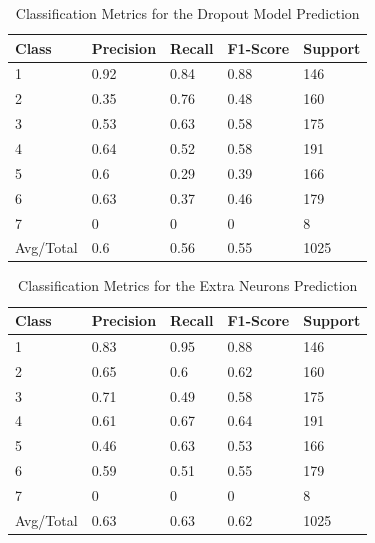 \documentclass[11pt]{article}
\begin{document}
	\begin{table}[H]
		\centering
		\caption{Classification Metrics for the Dropout Model Prediction}
		\begin{tabular}{l|llll}
			Class     & Precision & Recall & F1-Score & Support \\\hline
			1         & 0.92      & 0.84   & 0.88     & 146     \\
			2         & 0.35      & 0.76   & 0.48     & 160     \\
			3         & 0.53      & 0.63   & 0.58     & 175     \\
			4         & 0.64      & 0.52   & 0.58     & 191     \\
			5         & 0.6       & 0.29   & 0.39     & 166     \\
			6         & 0.63      & 0.37   & 0.46     & 179     \\
			7         & 0         & 0      & 0        & 8       \\
			Avg/Total & 0.6       & 0.56   & 0.55     & 1025   \\\hline\hline
		\end{tabular}
	\end{table}
	
	\begin{table}[H]
		\centering
		\caption{Classification Metrics for the Extra Neurons Prediction}
		\begin{tabular}{l|llll}
			Class     & Precision & Recall & F1-Score & Support \\\hline
			1         & 0.83      & 0.95   & 0.88     & 146     \\
			2         & 0.65      & 0.6    & 0.62     & 160     \\
			3         & 0.71      & 0.49   & 0.58     & 175     \\
			4         & 0.61      & 0.67   & 0.64     & 191     \\
			5         & 0.46      & 0.63   & 0.53     & 166     \\
			6         & 0.59      & 0.51   & 0.55     & 179     \\
			7         & 0         & 0      & 0        & 8       \\
			Avg/Total & 0.63      & 0.63   & 0.62     & 1025   \\\hline\hline
		\end{tabular}
	\end{table}
	
\end{document}
